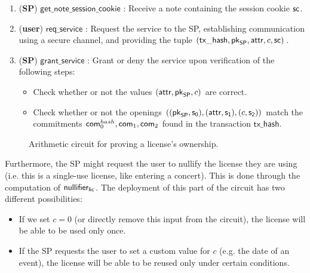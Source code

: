 \begin{enumerate}
	\item (\textbf{SP}) $\mathsf{get\_note\_session\_cookie}$ : Receive a note containing the session cookie $\mathsf{sc}$.

	\item (\textbf{user}) $\mathsf{req\_service}$ : Request the service to the SP, establishing communication using a secure channel, and providing the tuple $(\mathsf{tx\_hash}, \mathsf{pk}_{\mathsf{SP}}, \mathsf{attr}, c, \mathsf{sc})$.

	\item (\textbf{SP}) $\mathsf{grant\_service}$ : Grant or deny the service upon verification of the following steps:

	\begin{itemize}
		\item Check whether or not the values $(\mathsf{attr}, \mathsf{pk}_{\mathsf{SP}}, c)$ are correct.
		\item Check whether or not the openings $((\mathsf{pk}_{\mathsf{SP}}, \mathsf{s_0}), (\mathsf{attr}, \mathsf{s_1}), (c, \mathsf{s_2}))$ match the commitments $\mathsf{com}_0^{hash}, \mathsf{com}_1, \mathsf{com}_2$ found in the transaction $\mathsf{tx\_hash}$.
	\end{itemize}

\end{enumerate}

\begin{figure}[h]
	\centering
	\setlength{\fboxsep}{5pt}%
	\setlength{\fboxrule}{0.3pt}%
	\caption{Arithmetic circuit for proving a license's ownership.}
	\label{fig:circuit_prove_nft}
\end{figure}

Furthermore, the SP might request the user to nullify the license they are using (i.e. this is a single-use license, like entering a concert). This is done through the computation of $\mathsf{nullifier_{lic}}$. The deployment of this part of the circuit has two different possibilities:
\begin{itemize}
	\item If we set $c = 0$ (or directly remove this input from the circuit), the license will be able to be used only once.
	\item If the SP requests the user to set a custom value for $c$ (e.g. the date of an event), the license will be able to be reused only under certain conditions.
\end{itemize}
